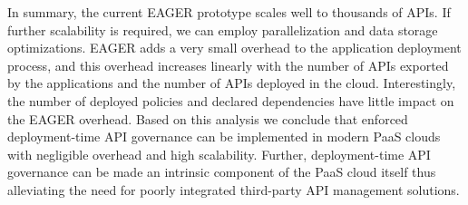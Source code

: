 In summary, the current EAGER prototype scales well to thousands of APIs.
If further scalability is required, we can employ
parallelization and data storage optimizations.
EAGER adds a very small overhead to the application deployment
process, and 
this overhead increases linearly with the number of APIs exported by the applications
and the number of APIs deployed in the cloud. 
Interestingly, the number of deployed policies and declared dependencies
have little impact on the EAGER overhead. Based on this analysis we
conclude that enforced deployment-time API governance can be implemented in modern PaaS
clouds with negligible overhead and high scalability. Further, deployment-time API governance
can be made an intrinsic component of the PaaS cloud itself thus alleviating the need
for poorly integrated third-party API management solutions.

